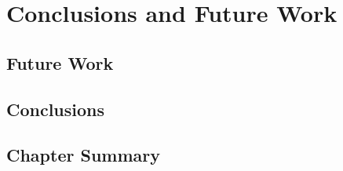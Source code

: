 \chapter{Conclusions and Future Work}\label{conclusions}
\section{Future Work}
\section{Conclusions}
\section{Chapter Summary}